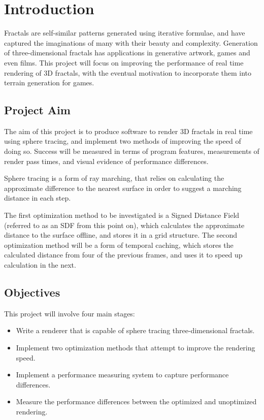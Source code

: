 \chapter{Introduction}
\label{chapter:introduction}

Fractals are self-similar patterns generated using iterative formulae, and have captured the imaginations of many with their beauty and complexity. Generation of three-dimensional fractals has applications in generative artwork, games and even films. This project will focus on improving the performance of real time rendering of 3D fractals, with the eventual motivation to incorporate them into terrain generation for games.

\section{Project Aim}

The aim of this project is to produce software to render 3D fractals in real time using sphere tracing, and implement two methods of improving the speed of doing so. Success will be measured in terms of program features, measurements of render pass times, and visual evidence of performance differences.\newline

Sphere tracing is a form of ray marching, that relies on calculating the approximate difference to the nearest surface in order to suggest a marching distance in each step.\newline

The first optimization method to be investigated is a Signed Distance Field (referred to as an SDF from this point on), which calculates the approximate distance to the surface offline, and stores it in a grid structure. The second optimization method will be a form of temporal caching, which stores the calculated distance from four of the previous frames, and uses it to speed up calculation in the next.

\section{Objectives}

This project will involve four main stages:

\begin{itemize}
	\item Write a renderer that is capable of sphere tracing three-dimensional fractals.
	\item Implement two optimization methods that attempt to improve the rendering speed.
	\item Implement a performance measuring system to capture performance differences.
	\item Measure the performance differences between the optimized and unoptimized rendering.
\end{itemize}

